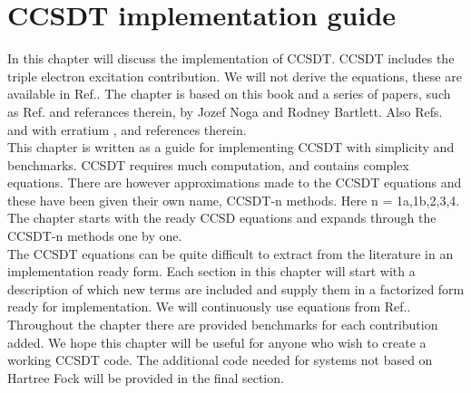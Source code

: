 \chapter{CCSDT implementation guide \label{ccsdt_chapter}}
%



In this chapter will discuss the implementation of CCSDT. CCSDT includes the triple electron excitation contribution. We will not derive the equations, these are available in Ref.\cite{CCSDT-ref4}. The chapter is based on this book and a series of papers, such as Ref.\cite{CCSDT-ref3} and referances therein, by Jozef Noga and Rodney Bartlett. Also Refs. \cite{CCSDT-ref5} and \cite{CCSDT-ref1} with erratium \cite{CCSDT-ref2}, and references therein. \\

This chapter is written as a guide for implementing CCSDT with simplicity and benchmarks. CCSDT requires much computation, and contains complex equations. There are however approximations made to the CCSDT equations and these have been given their own name, CCSDT-n methods. Here n = 1a,1b,2,3,4. The chapter starts with the ready CCSD equations and expands through the CCSDT-n methods one by one. \\

The CCSDT equations can be quite difficult to extract from the literature in an implementation ready form. Each section in this chapter will start with a description of which new terms are included and supply them in a factorized form ready for implementation. We will continuously use equations from Ref.\cite{CCSDT-ref4}. \\

Throughout the chapter there are provided benchmarks for each contribution added. We hope this chapter will be useful for anyone who wish to create a working CCSDT code. The additional code needed for systems not based on Hartree Fock will be provided in the final section.

